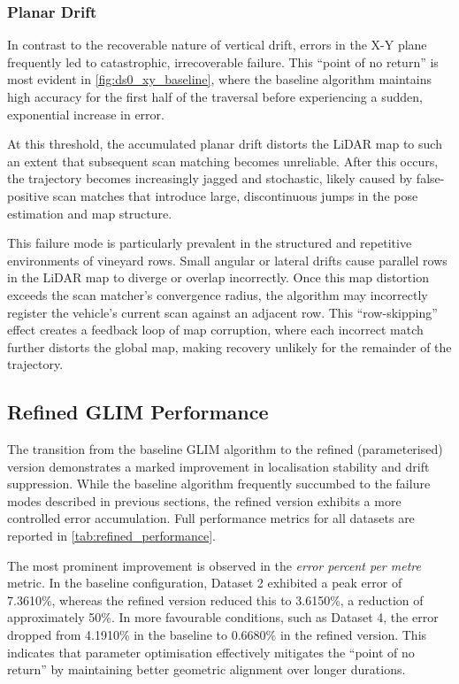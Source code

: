\subsubsection{Planar Drift}
In contrast to the recoverable nature of vertical drift, errors in the X-Y plane frequently led to catastrophic, irrecoverable failure. This ``point of no return'' is most evident in \cref{fig:ds0_xy_baseline}, where the baseline algorithm maintains high accuracy for the first half of the traversal before experiencing a sudden, exponential increase in error. 

At this threshold, the accumulated planar drift distorts the LiDAR map to such an extent that subsequent scan matching becomes unreliable. After this occurs, the trajectory becomes increasingly jagged and stochastic, likely caused by false-positive scan matches that introduce large, discontinuous jumps in the pose estimation and map structure. 

This failure mode is particularly prevalent in the structured and repetitive environments of vineyard rows. Small angular or lateral drifts cause parallel rows in the LiDAR map to diverge or overlap incorrectly. Once this map distortion exceeds the scan matcher's convergence radius, the algorithm may incorrectly register the vehicle's current scan against an adjacent row. This ``row-skipping'' effect creates a feedback loop of map corruption, where each incorrect match further distorts the global map, making recovery unlikely for the remainder of the trajectory.

\subsection{Refined GLIM Performance}
\label{subsec:slam-discussion-refined}

The transition from the baseline GLIM algorithm to the refined (parameterised) version demonstrates a marked improvement in localisation stability and drift suppression. While the baseline algorithm frequently succumbed to the failure modes described in previous sections, the refined version exhibits a more controlled error accumulation. Full performance metrics for all datasets are reported in \cref{tab:refined_performance}.

The most prominent improvement is observed in the \textit{error percent per metre} metric. In the baseline configuration, Dataset 2 exhibited a peak error of 7.3610\%, whereas the refined version reduced this to 3.6150\%, a reduction of approximately 50\%. In more favourable conditions, such as Dataset 4, the error dropped from 4.1910\% in the baseline to 0.6680\% in the refined version. This indicates that parameter optimisation effectively mitigates the ``point of no return'' by maintaining better geometric alignment over longer durations.


